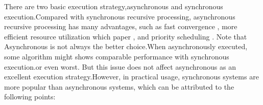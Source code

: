 \begin{comment}
{\color{red}
New interest has recently re-emerged around Datalog for a wide spectrum of knowledge-oriented applications \cite{Aref:2015:DIL:2723372.2742796,7840589,Shkapsky:2013:GQN:2536274.2536290,Alvaro:2010:DDT:2185923.2185942,Shkapsky:2016:BDA:2882903.2915229,Lam:2013:SDE:2510649.2511289,Seo:2013:DSD:2556549.2556572,Wang:2015:AFR:2824032.2824052}%
{\color{red}Datalog is an excellent candidate language for large-scale data analytics because of its high-level declarative semantics and support for recursion. Datalog's support for recursion makes the expression of data analysis natural \cite{}{\color{red}which paper}  and its high-level semantics makes it amenable to parallelization and optimization \cite{}{\color{red}which paper}.

In recent years, many system research efforts have raised to improve performance  and scalability based on Datalog systems. Socialite \cite{Lam:2013:SDE:2510649.2511289,Seo:2013:DSD:2556549.2556572} provides a large scale graph evaluation system supporting both sequential and distribute environment. In Socialite, users can define recursive aggregate functions which, as long as they are meet operations, can be evaluated incrementally and efficiently. The \cite{7113340} project provides a full Datalog language implementation and seeks to provide  system supports that optimizes execution over diverse platforms including sequential implementations \cite{Shkapsky:2016:BDA:2882903.2915229}, multi-core machines, and clusters \cite{Shkapsky:2016:BDA:2882903.2915229}. It supports relational algebra, aggregation, and recursion, as well as a host of declarative optimizations. MyriaX \cite{Halperin:2014:DMB:2588555.2594530} implements a Datalog System on share-nothing engines based on Myria \cite{Halperin:2014:DMB:2588555.2594530}. The computations are incremental, and it support s a variety of iterative models (synchronous, asynchronous, different processing priorities) and failure-handling techniques. It is worth mentioning that MyriaX supports asynchronous processing and shows promising performance for some applications, but it fails to tell in which cases asynchronous processing is suited.
}
\end{comment}
There are two basic execution strategy,asynchronous and synchronous execution.Compared with synchronous recursive processing, asynchronous recursive processing has many advantages, such as fast convergence \cite{maiter}, more efficient resource utilization \cite{}{\color{red}which paper} , and priority scheduling \cite{Zhang:2011:PDF:2038916.2038929}. Note that Asynchronous is not always the better choice.When asynchronously executed, some algorithm might shows comparable performance with synchronous execution.or even worst. But this issue does not affect asynchronous as an excellent execution strategy.However, in practical usage, synchronous systems are more popular than asynchronous systems, which can be attributed to the following points:


